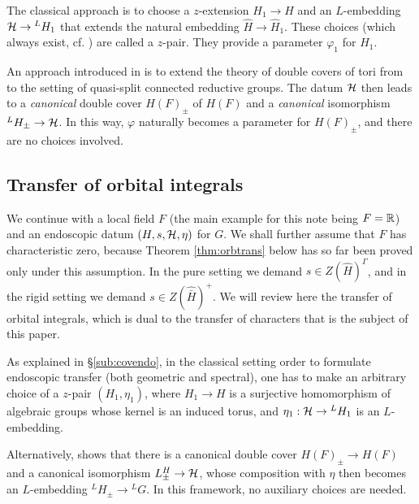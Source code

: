 \documentclass{article}
\theoremstyle{definition}
\numberwithin{equation}{section}
\renewcommand{\-}{\hyp{}}
\begin{document}
The classical approach is to choose a $z$-extension $H_1 \to H$ and an $L$\-embedding $\mathcal{H} \to {^LH_1}$ that extends the natural embedding $\hat H \to \hat H_1$. These choices (which always exist, cf. \cite[\S2.2]{KS99}) are called a $z$-pair. They provide a parameter $\varphi_1$ for $H_1$.

An approach introduced in \cite{KalHDC} is to extend the theory of double covers of tori from \cite{KalDC} to the setting of quasi-split connected reductive groups. The datum $\mathcal{H}$ then leads to a \emph{canonical} double cover $H(F)_\pm$ of $H(F)$ and a \emph{canonical} isomorphism $^LH_\pm \to \mathcal{H}$. In this way, $\varphi$ naturally becomes a parameter for $H(F)_\pm$, and there are no choices involved.

\subsection{Transfer of orbital integrals} \label{sub:transfer}

We continue with a local field $F$ (the main example for this note being $F=\mathbb{R}$) and an endoscopic datum $(H,s,\mathcal{H},\eta)$ for $G$. We shall further assume that $F$ has characteristic zero, because Theorem \ref{thm:orbtrans} below has so far been proved only under this assumption. In the pure setting we demand $s \in Z(\hat H)^\Gamma$, and in the rigid setting we demand $s \in Z(\hat{\bar H})^+$. We will review here the transfer of orbital integrals, which is dual to the transfer of characters that is the subject of this paper.

As explained in \S\ref{sub:covendo}, in the classical setting order to formulate endoscopic transfer (both geometric and spectral), one has to make an arbitrary choice of a $z$-pair $(H_1,\eta_1)$, where $H_1 \to H$ is a surjective homomorphism of algebraic groups whose kernel is an induced torus, and $\eta_1 : \mathcal{H} \to {^LH_1}$ is an $L$\-embedding. 

Alternatively, \cite{KalHDC} shows that there is a canonical double cover $H(F)_\pm \to H(F)$ and a canonical isomorphism $L^H_\pm \to \mathcal{H}$, whose composition with $\eta$ then becomes an $L$\-embedding $^LH_\pm \to {^LG}$. In this framework, no auxiliary choices are needed.
\end{document}
